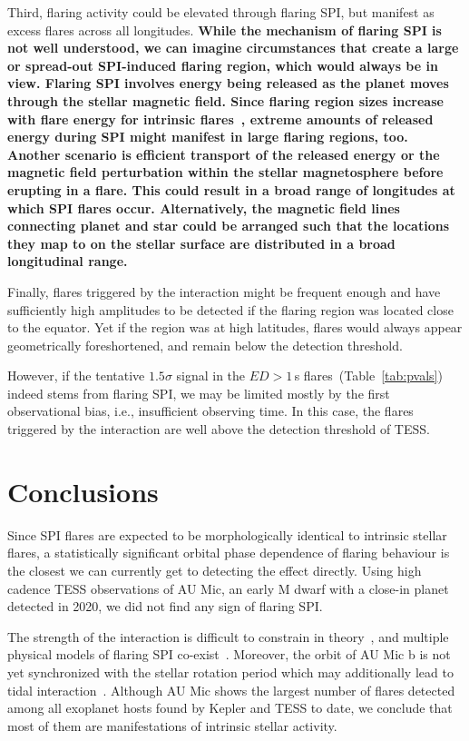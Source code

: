 \documentclass[fleqn,usenatbib]{mnras}%
\begin{document}
Third, flaring activity could be elevated through flaring SPI, but manifest as excess flares across all longitudes. \textbf{While the mechanism of flaring SPI is not well understood, we can imagine circumstances that create a large or spread-out SPI-induced flaring region, which would always be in view. Flaring SPI involves energy being released as the planet moves through the stellar magnetic field. Since flaring region sizes increase with flare energy for intrinsic flares~\citep{sammis2000dependence, notsu2019kepler, howard2020evryflare}, extreme amounts of released energy during SPI might manifest in large flaring regions, too. Another scenario is efficient transport of the released energy or the magnetic field perturbation within the stellar magnetosphere before erupting in a flare. This could result in a broad range of longitudes at which SPI flares occur. Alternatively, the magnetic field lines connecting planet and star could be arranged such that the locations they map to on the stellar surface are distributed in a broad longitudinal range.}

Finally, flares triggered by the interaction might be frequent enough and have sufficiently high amplitudes to be detected if the flaring region was located close to the equator. Yet if the region was at high latitudes, flares would always appear geometrically foreshortened, and remain below the detection threshold.

However, if the tentative $1.5\sigma$ signal in the $ED>1$\,s flares~(Table~\ref{tab:pvals}) indeed stems from flaring SPI, we may be limited mostly by the first observational bias, i.e., insufficient observing time. In this case, the flares triggered by the interaction are well above the detection threshold of TESS.

\section{Conclusions}
\label{sec:conclusions}
Since SPI flares are expected to be morphologically identical to intrinsic stellar flares, a statistically significant orbital phase dependence of flaring behaviour is the closest we can currently get to detecting the effect directly. Using high cadence TESS observations of AU Mic, an early M dwarf with a close-in planet detected in 2020, we did not find any sign of flaring SPI.

The strength of the interaction is difficult to constrain in theory~\citep{strugarek2019}, and multiple physical models of flaring SPI co-exist~\citep{lanza2018close-by, saur2013magnetic}. Moreover, the orbit of AU Mic b is not yet synchronized with the stellar rotation period which may additionally lead to tidal interaction~\citep{cuntz2000stellar}. Although AU Mic shows the largest number of flares detected among all exoplanet hosts found by Kepler and TESS to date, we conclude that most of them are manifestations of intrinsic stellar activity. 
\end{document}
